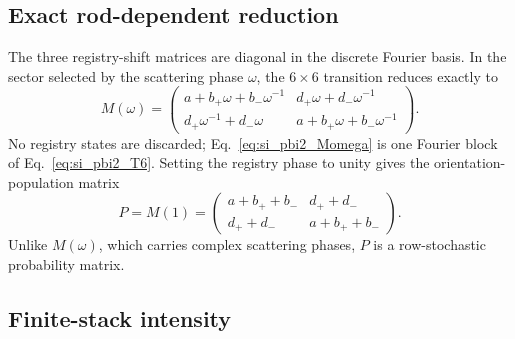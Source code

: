 \documentclass[11pt]{article}
\begin{document}
\subsection{Exact rod-dependent reduction}

The three registry-shift matrices are diagonal in the discrete Fourier basis.
In the sector selected by the scattering phase $\omega$, the $6\times6$
transition reduces exactly to
\begin{equation}
 M(\omega)=
 \begin{pmatrix}
 a+b_+\omega+b_-\omega^{-1} & d_+\omega+d_-\omega^{-1}\\
 d_+\omega^{-1}+d_-\omega & a+b_+\omega+b_-\omega^{-1}
 \end{pmatrix}.
 \label{eq:si_pbi2_Momega}
\end{equation}
No registry states are discarded; Eq.~\eqref{eq:si_pbi2_Momega} is one Fourier
block of Eq.~\eqref{eq:si_pbi2_T6}.  Setting the registry phase to unity gives
the orientation-population matrix
\begin{equation}
 P=M(1)=
 \begin{pmatrix}
 a+b_++b_- & d_++d_-\\
 d_++d_- & a+b_++b_-
 \end{pmatrix}.
 \label{eq:si_pbi2_P}
\end{equation}
Unlike $M(\omega)$, which carries complex scattering phases, $P$ is a
row-stochastic probability matrix.

\subsection{Finite-stack intensity}
\end{document}
